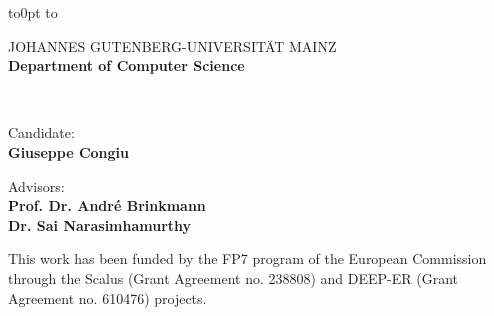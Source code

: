\documentclass[a4paper,titlepage,oneside,11pt]{book}
\author{Giuseppe Congiu}
\begin{document}
\hypersetup{citecolor=black,filecolor=black,linkcolor=black,urlcolor=blue} %

\begin{titlepage}
\thispagestyle{empty}

\begin{flushleft}
\vbox to0pt{
\vbox to\vss}
\end{flushleft}

\begin{center}
        \large JOHANNES GUTENBERG-UNIVERSIT{\"A}T MAINZ \\
        \large \textbf{Department of Computer Science}
\end{center}

\begin{center}
	 \\
	\vspace{0.2cm}
\end{center}
\vspace{1.7cm}

\begin{flushright}
	Candidate:\\
	\textbf{Giuseppe Congiu}\\
\end{flushright}

\begin{flushright}
	Advisors:\\
	\textbf{Prof. Dr. Andr\'e Brinkmann}\\
        \textbf{Dr. Sai Narasimhamurthy}
\end{flushright}

\vspace{\fill}
\small This work has been funded by the FP7 program of the European Commission through the Scalus (Grant Agreement no. 238808) and DEEP-ER (Grant Agreement no. 610476) projects.

\end{titlepage}
\end{document}
